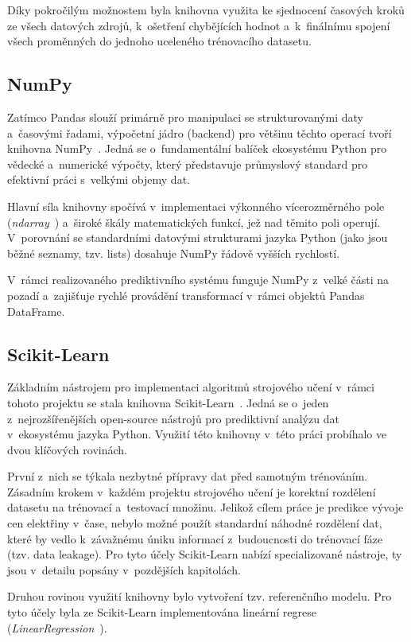 \documentclass[a4paper]{article}
\begin{document}
Díky pokročilým možnostem byla knihovna využita ke sjednocení časových kroků ze všech datových zdrojů, k~ošetření chybějících hodnot a~k~finálnímu spojení všech proměnných do jednoho uceleného trénovacího datasetu. 

\subsection{NumPy}
Zatímco Pandas slouží primárně pro manipulaci se strukturovanými daty a~časovými řadami, výpočetní jádro (backend) pro většinu těchto operací tvoří knihovna NumPy~\cite{numpy-docs}. Jedná se o~fundamentální balíček ekosystému Python pro vědecké a~numerické výpočty, který představuje průmyslový standard pro efektivní práci s~velkými objemy dat.

Hlavní síla knihovny spočívá v~implementaci výkonného vícerozměrného pole 
(\textit{ndarray}~\cite{numpy-ndarray}) a~široké škály matematických funkcí, 
jež nad těmito poli operují. V~porovnání se standardními datovými strukturami 
jazyka Python (jako jsou běžné seznamy, tzv. lists) dosahuje NumPy řádově 
vyšších rychlostí.

V~rámci realizovaného prediktivního systému funguje NumPy z~velké části na pozadí a~zajišťuje rychlé provádění transformací v~rámci objektů Pandas DataFrame. 

\subsection{Scikit-Learn}
Základním nástrojem pro implementaci algoritmů strojového učení v~rámci tohoto projektu se stala knihovna Scikit-Learn~\cite{scikit-learn}. Jedná se o~jeden z~nejrozšířenějších open-source nástrojů pro prediktivní analýzu dat v~ekosystému jazyka Python. Využití této knihovny v~této práci probíhalo ve dvou klíčových rovinách.

První z~nich se týkala nezbytné přípravy dat před samotným trénováním. Zásadním krokem v~každém projektu strojového učení je korektní rozdělení datasetu na trénovací a~testovací množinu. Jelikož cílem práce je predikce vývoje cen elektřiny v~čase, nebylo možné použít standardní náhodné rozdělení dat, které by vedlo k~závažnému úniku informací z~budoucnosti do trénovací fáze (tzv. data leakage). Pro tyto účely Scikit-Learn nabízí specializované nástroje, ty jsou v~detailu popsány v~pozdějších kapitolách.  

Druhou rovinou využití knihovny bylo vytvoření tzv. referenčního modelu. Pro tyto účely byla ze Scikit-Learn implementována lineární regrese (\textit{LinearRegression}~\cite{linear-regression}).
\end{document}
